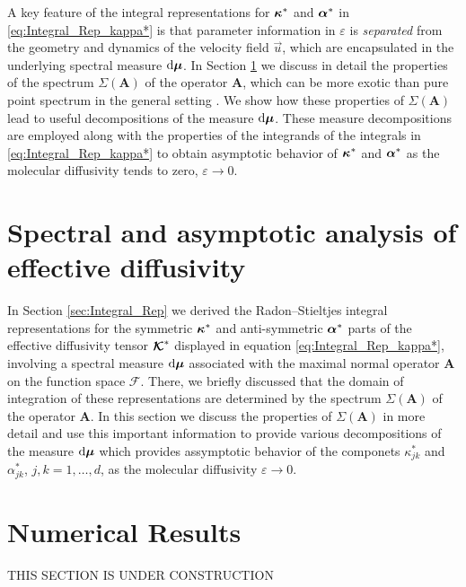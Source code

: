 \documentclass[11pt]{amsart}
\renewcommand{\d}{\mathrm{d}}
\newcommand{\Ab}{\mathbf{A}}
\newcommand\Kbc{\mbox{\boldmath${\mathcal{K}}$}}
\newcommand{\Fs}{\mathscr{F}}
\newcommand\bmu{\mbox{\boldmath${\mu}$}}
\newcommand\balpha{\mbox{\boldmath${\alpha}$}}
\newcommand\bkappa{\mbox{\boldmath${\kappa}$}}
\begin{document}
A key feature of the integral representations for $\bkappa^*$ and
$\balpha^*$ in \eqref{eq:Integral_Rep_kappa*} is that parameter
information in $\varepsilon$ is \emph{separated} from the geometry and dynamics
of the velocity field $\vec{u}$, which are encapsulated in the
underlying spectral measure $\d\bmu$. In Section
\ref{sec:Assymptotics} we discuss in 
detail the properties of the spectrum $\Sigma(\Ab)$ of the operator $\Ab$,
which can be more exotic than pure point spectrum in the general
setting \cite{Reed-1980,Stone:64}. We show how these properties of
$\Sigma(\Ab)$ lead to useful decompositions of the measure $\d\bmu$. These
measure decompositions are employed along with the properties of the 
integrands of the integrals in \eqref{eq:Integral_Rep_kappa*} to
obtain asymptotic behavior of $\bkappa^*$ and $\balpha^*$ as the
molecular diffusivity tends to zero, $\varepsilon\to0$.     









\section{Spectral and asymptotic analysis of effective
  diffusivity} \label{sec:Assymptotics}
%
In Section \ref{sec:Integral_Rep} we derived the Radon--Stieltjes
integral representations for the symmetric $\bkappa^*$ and
anti-symmetric $\balpha^*$ parts of the effective diffusivity tensor
$\Kbc^*$ displayed in equation \eqref{eq:Integral_Rep_kappa*},
involving a spectral measure $\d\bmu$ associated with the maximal
normal operator $\Ab$ on the function space $\Fs$. There, we briefly
discussed that the domain of integration of these representations are
determined by the spectrum $\Sigma(\Ab)$ of the operator $\Ab$. In this
section we discuss the properties of $\Sigma(\Ab)$ in more detail and use
this important information to provide various decompositions of the
measure $\d\bmu$ which provides assymptotic behavior of the componets
$\kappa^*_{jk}$ and $\alpha^*_{jk}$, $j,k=1,\ldots,d$, as the molecular diffusivity
$\varepsilon\to0$.






\section{Numerical Results}\label{sec:Num_Results}
%
THIS SECTION IS UNDER CONSTRUCTION
\end{document}
